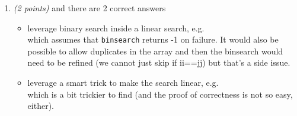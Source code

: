 \documentclass[a4paper]{article}
\begin{document}
\begin{enumerate}
\item
  \emph{(2 points)} and there are 2 correct answers
  \begin{itemize}
    \item
      leverage binary search inside a linear search, e.g.
      \\
      which assumes that \texttt{binsearch} returns -1 on failure.
      It would also be possible to allow duplicates in the array and then the binsearch would need to be refined (we cannot just skip if ii==jj) but that's a side issue.
    \item
      leverage a smart trick to make the search linear, e.g.
      \\
      which is a bit trickier to find (and the proof of correctness is not so easy, either).
  \end{itemize}
\end{enumerate}
\end{document}
